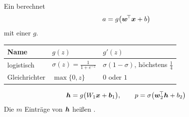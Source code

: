 \begin{merksatz}
Ein  berechnet
\[ a = g\bigl(\boldsymbol{w}^{\!\top}\boldsymbol{x} + b\bigr) \]
mit einer  $g$.

\begin{center}
{\small
\renewcommand{\arraystretch}{1.55}
\begin{tabular}{@{}P{2.4cm}P{3.0cm}P{3.2cm}@{}}
\toprule
\textbf{Name} & $g(z)$ & $g'(z)$\\
\midrule
logistisch & $\sigma(z) = \frac{1}{1+e^{-z}}$ & $\sigma(1-\sigma)$, höchstens $\tfrac14$\\
Gleichrichter & $\max\{0,z\}$ & $0$ oder $1$\\
\bottomrule
\end{tabular}}
\end{center}

\begin{center}
\begin{minipage}{0.88\textwidth}
\end{minipage}
\end{center}
\end{merksatz}

\begin{definition}
\[ \boldsymbol{h} = g\bigl(W_1\boldsymbol{x} + \boldsymbol{b}_1\bigr), \qquad p = \sigma\bigl(\boldsymbol{w}_2^{\!\top}\boldsymbol{h} + b_2\bigr) \]
Die $m$ Einträge von $\boldsymbol{h}$ heißen .
\end{definition}

